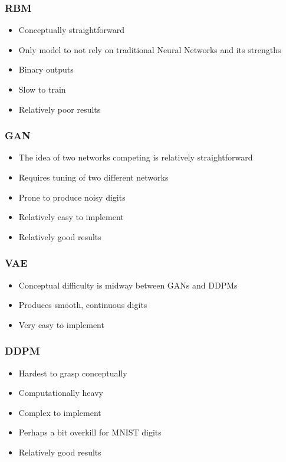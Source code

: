\documentclass{article}
\begin{document}
\subsubsection*{RBM}
\begin{itemize}
    \item Conceptually straightforward
    \item Only model to not rely on traditional Neural Networks and its strengths
    \item Binary outputs
    \item Slow to train
    \item Relatively poor results
\end{itemize}
\subsubsection*{GAN}
\begin{itemize}
    \item The idea of two networks competing is relatively straightforward
    \item Requires tuning of two different networks
    \item Prone to produce noisy digits
    \item Relatively easy to implement
    \item Relatively good results
\end{itemize}
\subsubsection*{VAE}
\begin{itemize}
    \item Conceptual difficulty is midway between GANs and DDPMs
    \item Produces smooth, continuous digits
    \item Very easy to implement
\end{itemize}
\subsubsection*{DDPM}
\begin{itemize}
    \item Hardest to grasp conceptually
    \item Computationally heavy
    \item Complex to implement
    \item Perhaps a bit overkill for MNIST digits
    \item Relatively good results
\end{itemize}
\end{document}
